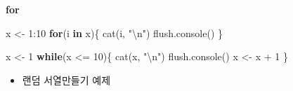 \documentclass[
]{book}
\newenvironment{Shaded}{\begin{snugshade}}{\end{snugshade}}
\newcommand{\ControlFlowTok}[1]{\textcolor[rgb]{0.13,0.29,0.53}{\textbf{#1}}}
\newcommand{\DecValTok}[1]{\textcolor[rgb]{0.00,0.00,0.81}{#1}}
\newcommand{\FunctionTok}[1]{\textcolor[rgb]{0.00,0.00,0.00}{#1}}
\newcommand{\NormalTok}[1]{#1}
\newcommand{\OtherTok}[1]{\textcolor[rgb]{0.56,0.35,0.01}{#1}}
\newcommand{\SpecialCharTok}[1]{\textcolor[rgb]{0.00,0.00,0.00}{#1}}
\newcommand{\StringTok}[1]{\textcolor[rgb]{0.31,0.60,0.02}{#1}}
\providecommand{\tightlist}{%
  \setlength{\itemsep}{0pt}\setlength{\parskip}{0pt}}
\begin{document}
\textbf{for}

\begin{Shaded}
\begin{Highlighting}[]
\NormalTok{x }\OtherTok{\textless{}{-}} \DecValTok{1}\SpecialCharTok{:}\DecValTok{10}
\ControlFlowTok{for}\NormalTok{(i }\ControlFlowTok{in}\NormalTok{ x)\{}
  \FunctionTok{cat}\NormalTok{(i, }\StringTok{"}\SpecialCharTok{\textbackslash{}n}\StringTok{"}\NormalTok{)}
  \FunctionTok{flush.console}\NormalTok{()}
\NormalTok{\}}
\end{Highlighting}
\end{Shaded}

\begin{Shaded}
\begin{Highlighting}[]
\NormalTok{x }\OtherTok{\textless{}{-}} \DecValTok{1}
\ControlFlowTok{while}\NormalTok{(x }\SpecialCharTok{\textless{}=} \DecValTok{10}\NormalTok{)\{}
  \FunctionTok{cat}\NormalTok{(x, }\StringTok{"}\SpecialCharTok{\textbackslash{}n}\StringTok{"}\NormalTok{)}
  \FunctionTok{flush.console}\NormalTok{()}
\NormalTok{  x }\OtherTok{\textless{}{-}}\NormalTok{ x }\SpecialCharTok{+} \DecValTok{1}
\NormalTok{\}}
\end{Highlighting}
\end{Shaded}

\begin{itemize}
\tightlist
\item
  랜덤 서열만들기 예제
\end{itemize}
\end{document}

